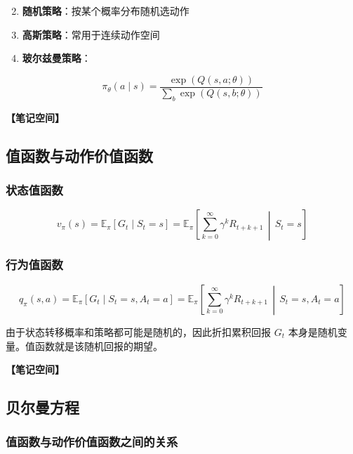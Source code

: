 \documentclass[12pt,a4paper]{article}
\newcommand{\notespace}[1][3cm]{%
  \vspace{#1}%
  \noindent\textbf{【笔记空间】}%
  \vspace{#1}%
}
\newcommand{\E}{\mathbb{E}}
\newcommand{\1}{\mathbf{1}}
\begin{document}
\begin{enumerate}[leftmargin=2em]
  \setcounter{enumi}{1}
  \item \textbf{随机策略}：按某个概率分布随机选动作
  \item \textbf{高斯策略}：常用于连续动作空间
  \item \textbf{玻尔兹曼策略}：
\end{enumerate}

\begin{equation}
\pi_\theta(a\mid s)= \frac{\exp(Q(s,a;\theta))} {\sum_b \exp(Q(s,b;\theta))}
\end{equation}

\notespace[2cm]

\subsection{值函数与动作价值函数}

\subsubsection*{状态值函数}

\begin{equation}
v_\pi(s)=\E_\pi[G_t\mid S_t=s] =\E_\pi\left[\sum_{k=0}^{\infty}\gamma^k R_{t+k+1}\,\middle|\, S_t=s\right]
\end{equation}

\subsubsection*{行为值函数}

\begin{equation}
q_\pi(s,a)=\E_\pi[G_t\mid S_t=s,A_t=a] =\E_\pi\left[\sum_{k=0}^{\infty}\gamma^k R_{t+k+1}\,\middle|\, S_t=s,A_t=a\right]
\end{equation}

\begin{notebox}
由于状态转移概率和策略都可能是随机的，因此折扣累积回报 $G_t$ 本身是随机变量。值函数就是该随机回报的期望。
\end{notebox}

\notespace[2cm]

\subsection{贝尔曼方程}

\subsubsection*{值函数与动作价值函数之间的关系}
\end{document}
